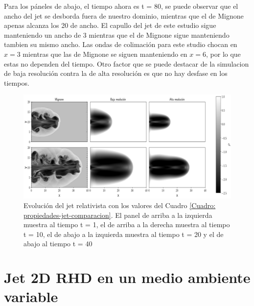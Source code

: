 \documentclass[12pt,a4paper]{book}
\begin{document}
Para los páneles de abajo, el tiempo ahora es t = 80, se puede observar que el ancho del jet se desborda
fuera de nuestro dominio, mientras que el de Mignone apenas alcanza los 20 de ancho. El capullo del jet
de este estudio sigue manteniendo un ancho de 3 mientras que el de Mignone sigue manteniendo tambien su
mismo ancho. Las ondas de colimación para este studio chocan en $x = 3$ mientras que las de
Mignone se siguen manteniendo en $x = 6$, por lo que estas no dependen del tiempo. Otro factor
que se puede destacar de la simulacion de baja resolución contra la de alta resolución es que no hay 
desfase en los tiempos.


\begin{figure}
  \centering
  \includegraphics[width=1\textwidth]{./Figuras/jet/comparacion/multiple_comparation.png}
    \caption{Evolución del jet relativista con los valores del Cuadro 
    \ref{Cuadro: propiedades-jet-comparacion}. El panel de arriba a la izquierda muestra al 
    tiempo t = 1, el de arriba a la derecha muestra al tiempo t = 10, 
    el de abajo a la izquierda muestra al tiempo t = 20 y el de abajo al tiempo t = 40 }\label{fig:comparacion_temporal_del_jet}
\end{figure}


\section{Jet 2D RHD en un medio ambiente variable}
\end{document}
